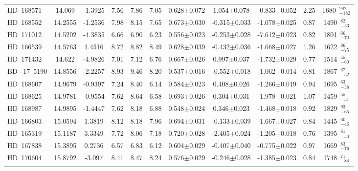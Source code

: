 {\begin{longtable}{lcccccccccc}
\noalign{\smallskip}
HD~168571 & 14.069 & -1.3925 & 7.56 & 7.86 & 7.05 & 0.628$\pm$0.072 & 1.054$\pm$0.078 & -0.833$\pm$0.052 & 2.25 & 1680~$_{-182}^{282}$ \\
\noalign{\smallskip}
HD~168552 & 14.2555 & -1.2536 & 7.98 & 8.15 & 7.65 & 0.673$\pm$0.030 & -0.315$\pm$0.033 & -1.078$\pm$0.025 & 0.87 & 1490~$_{-53}^{82}$ \\
\noalign{\smallskip}
HD~171012 & 14.5202 & -4.3835 & 6.66 & 6.90 & 6.23 & 0.556$\pm$0.023 & -0.253$\pm$0.028 & -7.612$\pm$0.023 & 0.82 & 1801~$_{-70}^{66}$ \\
\noalign{\smallskip}
HD~166539 & 14.5763 & 1.4516 & 8.72 & 8.82 & 8.49 & 0.628$\pm$0.039 & -0.432$\pm$0.036 & -1.668$\pm$0.027 & 1.26 & 1622~$_{-75}^{86}$ \\
\noalign{\smallskip}
HD~171432 & 14.622 & -4.9826 & 7.01 & 7.12 & 6.76 & 0.667$\pm$0.026 & 0.997$\pm$0.037 & -1.732$\pm$0.029 & 0.77 & 1514~$_{-60}^{55}$ \\
\noalign{\smallskip}
BD~-17~5190 & 14.8556 & -2.2257 & 8.93 & 9.46 & 8.20 & 0.537$\pm$0.016 & -0.552$\pm$0.018 & -1.062$\pm$0.014 & 0.81 & 1867~$_{-52}^{67}$ \\
\noalign{\smallskip}
HD~168607 & 14.9679 & -0.9397 & 7.24 & 8.40 & 6.14 & 0.584$\pm$0.023 & 0.408$\pm$0.026 & -1.266$\pm$0.019 & 0.94 & 1695~$_{-58}^{63}$ \\
\noalign{\smallskip}
HD~168625 & 14.9781 & -0.9554 & 7.62 & 8.64 & 6.58 & 0.693$\pm$0.026 & 0.304$\pm$0.031 & -1.978$\pm$0.021 & 1.07 & 1459~$_{-51}^{55}$ \\
\noalign{\smallskip}
HD~168987 & 14.9895 & -1.4447 & 7.62 & 8.18 & 6.88 & 0.548$\pm$0.024 & 0.346$\pm$0.023 & -1.468$\pm$0.018 & 0.92 & 1829~$_{-65}^{93}$ \\
\noalign{\smallskip}
HD~166803 & 15.0594 & 1.3819 & 8.12 & 8.18 & 7.96 & 0.694$\pm$0.031 & -0.133$\pm$0.039 & -1.667$\pm$0.027 & 0.84 & 1445~$_{-46}^{60}$ \\
\noalign{\smallskip}
HD~165319 & 15.1187 & 3.3349 & 7.72 & 8.06 & 7.18 & 0.720$\pm$0.028 & -2.405$\pm$0.024 & -1.205$\pm$0.018 & 0.76 & 1395~$_{-50}^{61}$ \\
\noalign{\smallskip}
HD~167838 & 15.3895 & 0.2736 & 6.57 & 6.83 & 6.12 & 0.604$\pm$0.029 & -0.407$\pm$0.040 & -0.775$\pm$0.022 & 0.97 & 1669~$_{-76}^{83}$ \\
\noalign{\smallskip}
HD~170604 & 15.8792 & -3.097 & 8.41 & 8.47 & 8.24 & 0.576$\pm$0.029 & -0.246$\pm$0.028 & -1.385$\pm$0.023 & 0.84 & 1748~$_{-84}^{71}$ \\
\noalign{\smallskip}

\end{longtable}}
